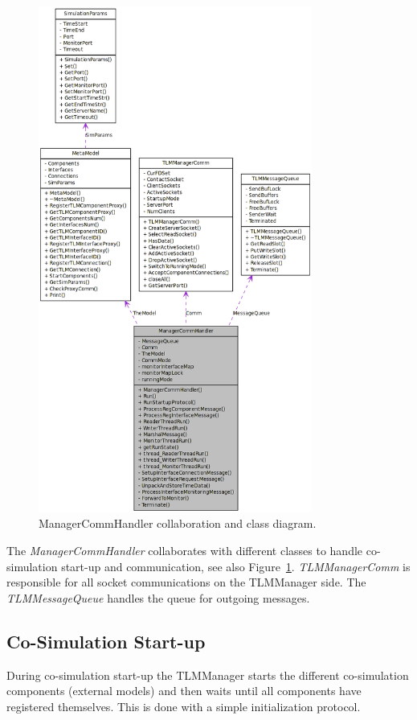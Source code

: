 \begin{figure}
    \begin{center}
    \includegraphics[width=9cm]{figs/classManagerCommHandler__coll__graph.png}
      \caption{ManagerCommHandler collaboration and class diagram.}
      \label{fig:ManagerCommHandlerClassDesign}
    \end{center}
\end{figure}

The {\em ManagerCommHandler} collaborates with different classes to handle co-simulation start-up and communication, see also Figure~\ref{fig:ManagerCommHandlerClassDesign}. 
{\em TLMManagerComm} is responsible for all socket communications on the TLMManager side. The {\em TLMMessageQueue} handles the queue for outgoing messages.

\subsection{Co-Simulation Start-up}
During co-simulation start-up the TLMManager starts the different co-simulation components (external models) and then waits until all components have registered themselves. 
This is done with a simple initialization protocol.

